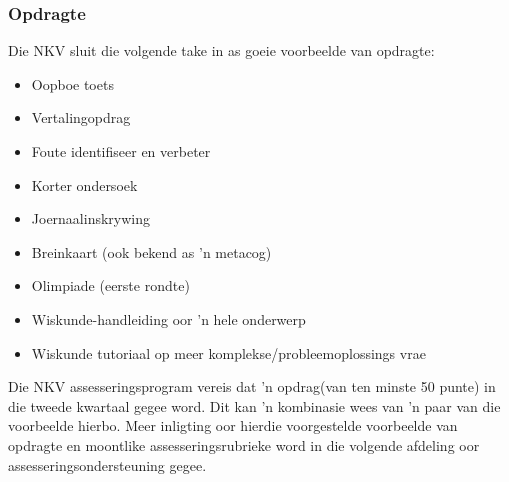 \subsubsection{Opdragte}
Die NKV sluit die volgende take in as goeie voorbeelde van opdragte:
\begin{itemize}[noitemsep]
\item
  Oopboe toets
\item
  Vertalingopdrag
\item
  Foute identifiseer en verbeter
\item
  Korter ondersoek
\item
  Joernaalinskrywing
\item
  Breinkaart (ook bekend as 'n metacog)
\item
  Olimpiade (eerste rondte)
\item
  Wiskunde-handleiding oor 'n hele onderwerp
\item
  Wiskunde tutoriaal op meer komplekse/probleemoplossings vrae
\end{itemize}
Die NKV assesseringsprogram vereis dat 'n opdrag(van ten minste 50 punte) in die tweede kwartaal gegee word. Dit kan 'n kombinasie wees van 'n paar van die voorbeelde hierbo. Meer inligting oor hierdie voorgestelde voorbeelde van opdragte en moontlike assesseringsrubrieke word in die volgende afdeling oor assesseringsondersteuning gegee.

